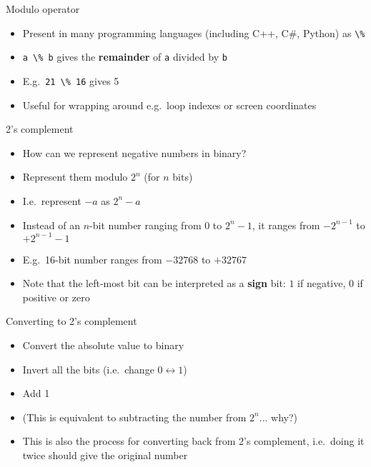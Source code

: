 \begin{frame}{Modulo operator}
    \begin{itemize}
        \pause\item Present in many programming languages (including C++, C\#, Python) as \lstinline{\%}
        \pause\item \lstinline{a \% b} gives the \textbf{remainder} of \lstinline{a} divided by \lstinline{b}
        \pause\item E.g.\ \lstinline{21 \% 16} gives 5
        \pause\item Useful for wrapping around e.g.\ loop indexes or screen coordinates
    \end{itemize}
\end{frame}

\begin{frame}{2's complement}
    \begin{itemize}
        \pause\item How can we represent negative numbers in binary?
        \pause\item Represent them modulo $2^n$ (for $n$ bits)
        \pause\item I.e.\ represent $-a$ as $2^n-a$
        \pause\item Instead of an $n$-bit number ranging from $0$ to $2^n-1$, it ranges from $-2^{n-1}$ to $+2^{n-1}-1$
        \pause\item E.g.\ 16-bit number ranges from $-32768$ to $+32767$
        \pause\item Note that the left-most bit can be interpreted as a \textbf{sign} bit:
            $1$ if negative, $0$ if positive or zero
    \end{itemize}
\end{frame}

\begin{frame}{Converting to 2's complement}
    \begin{itemize}
        \pause\item Convert the absolute value to binary
        \pause\item Invert all the bits (i.e.\ change $0 \leftrightarrow 1$)
        \pause\item Add 1
        \pause\item (This is equivalent to subtracting the number from $2^n$... why?)
        \pause\item This is also the process for converting back from 2's complement,
            i.e.\ doing it twice should give the original number
    \end{itemize}
\end{frame}

